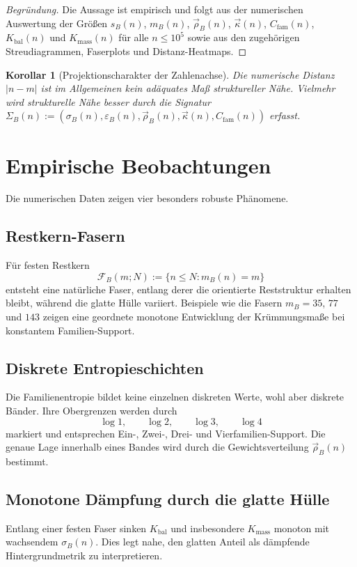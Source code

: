 \documentclass[11pt,a4paper]{article}
\newtheorem{korollar}[satz]{Korollar}
\theoremstyle{definition}
\theoremstyle{remark}
\begin{document}
\begin{proof}[Begründung]
Die Aussage ist empirisch und folgt aus der numerischen Auswertung der Größen $s_B(n)$, $m_B(n)$, $\vec\rho_B(n)$, $\vec\kappa(n)$, $C_{\mathrm{fam}}(n)$, $K_{\mathrm{bal}}(n)$ und $K_{\mathrm{mass}}(n)$ für alle $n\le 10^5$ sowie aus den zugehörigen Streudiagrammen, Faserplots und Distanz-Heatmaps.
\end{proof}

\begin{korollar}[Projektionscharakter der Zahlenachse]
Die numerische Distanz $|n-m|$ ist im Allgemeinen kein adäquates Maß struktureller Nähe. Vielmehr wird strukturelle Nähe besser durch die Signatur $\Sigma_B(n):=(\sigma_B(n),\varepsilon_B(n),\vec\rho_B(n),\vec\kappa(n),C_{\mathrm{fam}}(n))$ erfasst.
\end{korollar}

\section{Empirische Beobachtungen}
Die numerischen Daten zeigen vier besonders robuste Phänomene.

\subsection{Restkern-Fasern}
Für festen Restkern
\[
\mathcal F_B(m;N):=\{n\le N: m_B(n)=m\}
\]
entsteht eine natürliche Faser, entlang derer die orientierte Reststruktur erhalten bleibt, während die glatte Hülle variiert. Beispiele wie die Fasern $m_B=35$, $77$ und $143$ zeigen eine geordnete monotone Entwicklung der Krümmungsmaße bei konstantem Familien-Support.

\subsection{Diskrete Entropieschichten}
Die Familienentropie bildet keine einzelnen diskreten Werte, wohl aber diskrete Bänder. Ihre Obergrenzen werden durch
\[
\log 1,\qquad \log 2,\qquad \log 3,\qquad \log 4
\]
markiert und entsprechen Ein-, Zwei-, Drei- und Vierfamilien-Support. Die genaue Lage innerhalb eines Bandes wird durch die Gewichtsverteilung $\vec\rho_B(n)$ bestimmt.

\subsection{Monotone Dämpfung durch die glatte Hülle}
Entlang einer festen Faser sinken $K_{\mathrm{bal}}$ und insbesondere $K_{\mathrm{mass}}$ monoton mit wachsendem $\sigma_B(n)$. Dies legt nahe, den glatten Anteil als dämpfende Hintergrundmetrik zu interpretieren.
\end{document}
